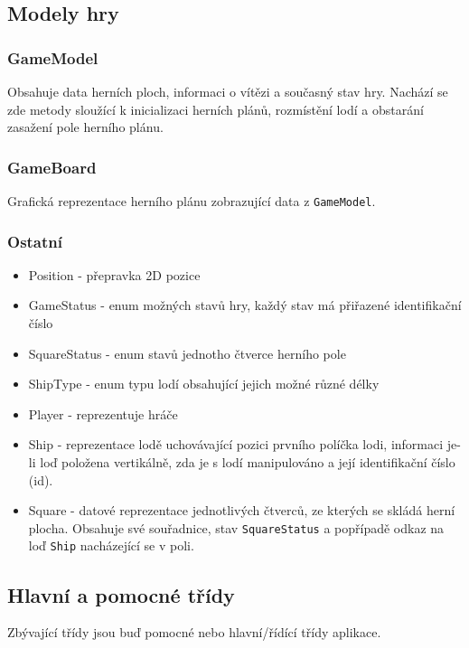 \documentclass[12pt, a4paper]{article} %
\begin{document}
	\subsection{Modely hry}
	\subsubsection{GameModel}
	\par Obsahuje data herních ploch, informaci o vítězi a současný stav hry. Nachází se zde metody sloužící k inicializaci herních plánů, rozmístění lodí a obstarání  zasažení pole herního plánu.
	
	\subsubsection{GameBoard}
	\par Grafická reprezentace herního plánu zobrazující data z \texttt{GameModel}.
	
	
	\subsubsection{Ostatní}
	\begin{itemize}
		\item Position - přepravka 2D pozice
		\item GameStatus - enum možných stavů hry, každý stav má přiřazené identifikační číslo
		\item SquareStatus - enum stavů jednotho čtverce herního pole
		\item ShipType - enum  typu lodí obsahující jejich možné různé délky
		\item Player - reprezentuje hráče
		\item Ship - reprezentace lodě uchovávající pozici prvního políčka lodi, informaci je-li loď položena vertikálně, zda je s lodí manipulováno a její identifikační číslo (id).
		\item Square - datové reprezentace jednotlivých čtverců, ze kterých se skládá herní plocha. Obsahuje své souřadnice, stav \texttt{SquareStatus} a popřípadě odkaz na loď \texttt{Ship} nacházející se v poli.
	\end{itemize}

	\subsection{Hlavní a pomocné třídy}
	\par Zbývající třídy jsou buď pomocné nebo hlavní/řídící třídy aplikace.
\end{document}
